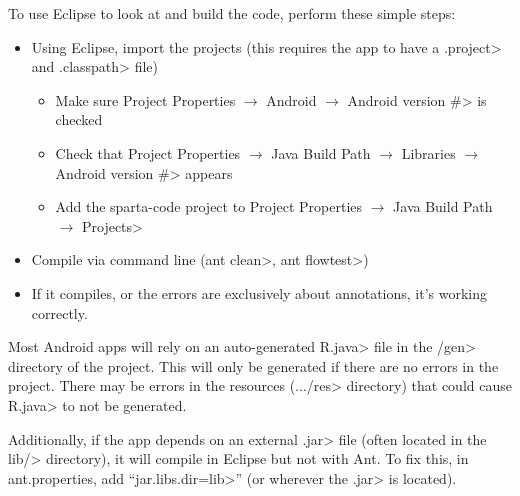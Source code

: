 To use Eclipse to look at and build the code, perform these simple
steps:
\begin{itemize}
\item
Using Eclipse, import the projects (this requires the app to have a
\<.project> and \<.classpath> file)
  \begin{itemize}
    \item
    Make sure
    \<Project Properties $\rightarrow$ Android $\rightarrow$ Android
    version \#> is checked

    \item
    Check that
    \<Project Properties $\rightarrow$ Java Build Path $\rightarrow$
    Libraries $\rightarrow$ Android version \#> appears

    \item
    Add the sparta-code project to
    \<Project Properties $\rightarrow$ Java Build Path $\rightarrow$ Projects>
    
  \end{itemize}

\item Compile via command line (\<ant clean>, \<ant flowtest>)

\item If it compiles, or the errors are exclusively about annotations,
  it's working correctly.
\end{itemize}

Most Android apps will rely on an auto-generated \<R.java> file
in the \</gen> directory of the project. This will only be generated
if there are no errors in the project. There may be errors in the
resources (\<.../res> directory) that could cause \<R.java> to not be
generated.

Additionally, if the app depends on an external \<.jar> file (often
located in the \<lib/> directory), it will compile in Eclipse but not
with Ant. To fix this, in ant.properties, add ``\<jar.libs.dir=lib>''
(or wherever the \<.jar> is located).




